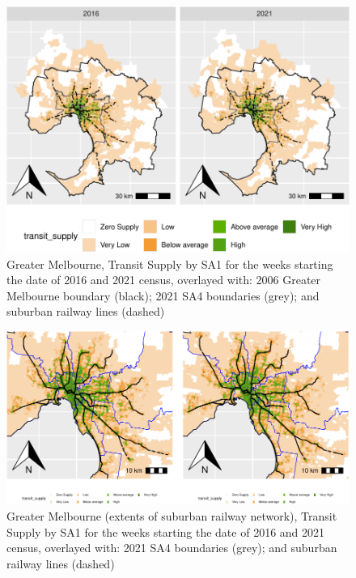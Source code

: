\documentclass[preprint, 3p,
authoryear]{elsarticle} %
\begin{document}
\begin{figure}
\centering
\includegraphics{Leveraging_GTFS_to_assess_transit_supply_Transport_Geography_files/figure-latex/Greater_Melbourne_2016_2021_plot-1.pdf}
\caption{Greater Melbourne, Transit Supply by SA1 for the weeks starting
the date of 2016 and 2021 census, overlayed with: 2006 Greater Melbourne
boundary (black); 2021 SA4 boundaries (grey); and suburban railway lines
(dashed)}
\end{figure}

\begin{figure}
\centering
\includegraphics{Leveraging_GTFS_to_assess_transit_supply_Transport_Geography_files/figure-latex/Greater_Melbourne_2016_2021_plot_railway_extents-1.pdf}
\caption{Greater Melbourne (extents of suburban railway network),
Transit Supply by SA1 for the weeks starting the date of 2016 and 2021
census, overlayed with: 2021 SA4 boundaries (grey); and suburban railway
lines (dashed)}
\end{figure}
\end{document}
